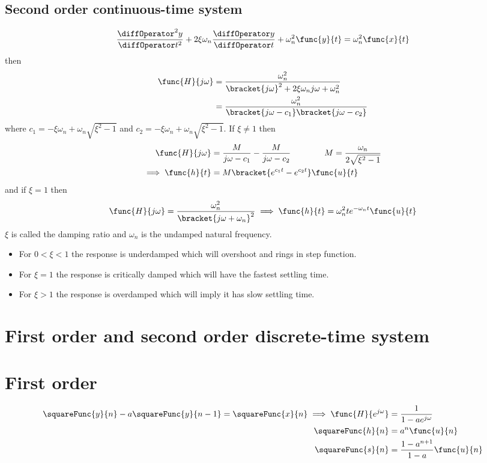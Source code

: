 \subsection*{Second order continuous-time system}
\begin{equation*}
    \dfrac{\diffOperator^2 y}{\diffOperator t^2} + 2 \xi \omega_n  \dfrac{\diffOperator y}{\diffOperator t} + \omega_n^2 \func{y}{t} = \omega_n^2 \func{x}{t}
\end{equation*}
then 
\begin{align*}
    \func{H}{j\omega} &= \dfrac{\omega_n^2}{\bracket{j\omega}^2 + 2 \xi \omega_n j \omega + \omega_n^2}\\
    &= \dfrac{\omega_n^2}{\bracket{j\omega - c_1} \bracket{j\omega - c_2}}
\end{align*}
where \(c_1 = - \xi \omega_n + \omega_n \sqrt{\xi^2 - 1}\) and \(c_2 = - \xi \omega_n + \omega_n \sqrt{\xi^2 - 1}\). If \(\xi \neq 1\) then 
\begin{align*}
    \func{H}{j\omega} &= \dfrac{M}{j\omega - c_1} - \dfrac{M}{j\omega - c_2} \qquad \qquad M = \dfrac{\omega_n}{2 \sqrt{\xi^2 - 1}}\\
    \implies \func{h}{t} &= M \bracket{e^{c_1 t} - e^{c_2 t}}\func{u}{t}
\end{align*}
and if \(\xi = 1\) then 
\begin{equation*}
    \func{H}{j\omega} = \dfrac{\omega_n^2}{\bracket{j\omega + \omega_n}^2} \implies \func{h}{t} = \omega_n^2 t e^{-\omega_n t} \func{u}{t}
\end{equation*}
\(\xi\) is called the damping ratio and \(\omega_n\) is the undamped natural frequency. 
\begin{itemize}
    \item For \(0 < \xi < 1\) the response is underdamped which will overshoot and rings in step function. 
    \item For \(\xi = 1\) the response is critically damped which will have the fastest settling time. 
    \item For \(\xi > 1\) the response is overdamped which will imply it has slow settling time.
\end{itemize}

\section{First order and second order discrete-time system}
\section{First order}
\begin{align*}
    \squareFunc{y}{n} - a \squareFunc{y}{n - 1} = \squareFunc{x}{n} \implies \func{H}{e^{j\omega}} &= \dfrac{1}{1 - a e^{j\omega}} \\
    \squareFunc{h}{n} &= a^n \func{u}{n} \\
    \squareFunc{s}{n} &= \dfrac{1 - a^{n+1}}{1 - a} \func{u}{n}
\end{align*}
